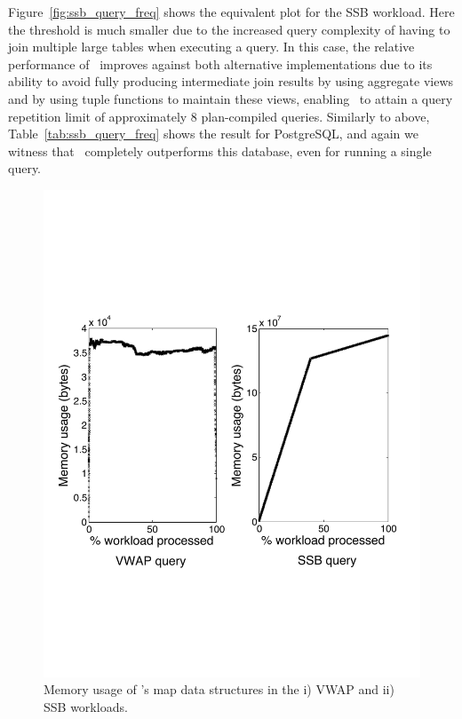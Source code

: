 Figure~\ref{fig:ssb_query_freq} shows the equivalent plot for the SSB workload.
Here the threshold is much smaller due to the increased query complexity of
having to join multiple large tables when executing a query. In this case, the
relative performance of \compiler\ improves against both alternative
implementations due to its ability to avoid fully producing intermediate join
results by using aggregate views and by using tuple functions to maintain these
views, enabling \compiler\ to attain a query repetition limit of approximately 8
plan-compiled queries. Similarly to above, Table~\ref{tab:ssb_query_freq} shows
the result for PostgreSQL, and again we witness that \compiler\ completely
outperforms this database, even for running a single query. 


\begin{figure}[tb]
\begin{center}
\includegraphics[scale=0.3]{../plots/mem_usage}
\end{center}
\vspace{-4mm}
\caption{Memory usage of \compiler's map data structures in the i)
VWAP and ii) SSB workloads.}
\label{fig:memusage}
\end{figure}

